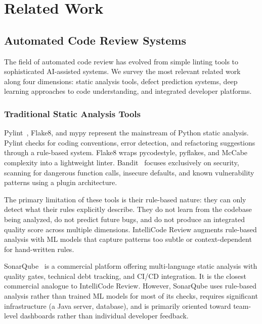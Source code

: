 \documentclass[12pt, oneside]{report}
\begin{document}
\chapter{Related Work}
\label{ch:related}

\section{Automated Code Review Systems}
\label{sec:rel-review}

The field of automated code review has evolved from simple linting tools to sophisticated
AI-assisted systems. We survey the most relevant related work along four dimensions:
static analysis tools, defect prediction systems, deep learning approaches to code
understanding, and integrated developer platforms.

\subsection{Traditional Static Analysis Tools}

Pylint~\cite{pylint}, Flake8, and mypy represent the mainstream of Python static analysis.
Pylint checks for coding conventions, error detection, and refactoring suggestions through
a rule-based system. Flake8 wraps pycodestyle, pyflakes, and McCabe complexity into a
lightweight linter. Bandit~\cite{bandit} focuses exclusively on security, scanning for
dangerous function calls, insecure defaults, and known vulnerability patterns using
a plugin architecture.

The primary limitation of these tools is their rule-based nature: they can only detect
what their rules explicitly describe. They do not learn from the codebase being analyzed,
do not predict future bugs, and do not produce an integrated quality score across multiple
dimensions. IntelliCode Review augments rule-based analysis with ML models that capture
patterns too subtle or context-dependent for hand-written rules.

SonarQube~\cite{sonarqube} is a commercial platform offering multi-language static analysis
with quality gates, technical debt tracking, and CI/CD integration. It is the closest
commercial analogue to IntelliCode Review. However, SonarQube uses rule-based analysis
rather than trained ML models for most of its checks, requires significant infrastructure
(a Java server, database), and is primarily oriented toward team-level dashboards rather
than individual developer feedback.
\end{document}
